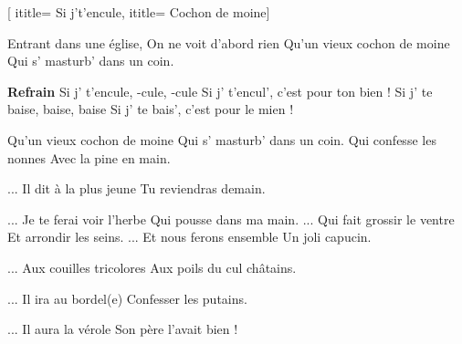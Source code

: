  [
ititle= {Si j't'encule},
ititle= {Cochon de moine}]


\beginverse
Entrant dans une église,
On ne voit d'abord rien
Qu'un vieux cochon de moine
Qui s' masturb' dans un coin.
\endverse

\beginchorus
\textbf {Refrain}
Si j' t'encule, -cule, -cule
Si j' t'encul', c'est pour ton bien !
Si j' te baise, baise, baise
Si j' te bais', c'est pour le mien !
\endchorus

\beginverse
Qu'un vieux cochon de moine
Qui s' masturb' dans un coin.
Qui confesse les nonnes
Avec la pine en main.
\endverse

\beginverse
... Il dit à la plus jeune
Tu reviendras demain.
\endverse

\beginverse
... Je te ferai voir l'herbe
Qui pousse dans ma main.
\endverse
... Qui fait grossir le ventre
Et arrondir les seins.
\beginverse
... Et nous ferons ensemble
Un joli capucin.
\endverse

\beginverse
... Aux couilles tricolores
Aux poils du cul châtains.
\endverse

\beginverse
... Il ira au bordel(e)
Confesser les putains.
\endverse

\beginverse
... Il aura la vérole
Son père l'avait bien !
\endverse

\endsong